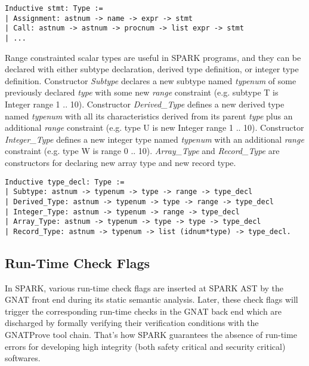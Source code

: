 \begin{lstlisting}[escapechar=\#, language=coq, basicstyle=\small]
Inductive stmt: Type := 
| Assignment: astnum -> name -> expr -> stmt 
| Call: astnum -> astnum -> procnum -> list expr -> stmt 
| ...
\end{lstlisting}

Range constrainted scalar types are useful in SPARK programs, and they can be
declared with either subtype declaration, derived type definition, or integer
type definition. 
Constructor \textit{Subtype} declares a new subtype named \textit{typenum}
of some previously declared \textit{type} with some new \textit{range}
constraint (e.g. subtype T is Integer range 1 .. 10).
Constructor \textit{Derived\_Type} defines a new derived type named
\textit{typenum} with all its characteristics derived from its parent
\textit{type} plus an additional \textit{range} constraint (e.g. type U is new
Integer range 1 .. 10).
Constructor \textit{Integer\_Type} defines a new integer type named
\textit{typenum} with an additional \textit{range} constraint (e.g. type W is
range 0 .. 10).
\textit{Array\_Type} and \textit{Record\_Type} are constructors for declaring
new array type and new record type.

\begin{lstlisting}[escapechar=\#, language=coq, basicstyle=\small]
Inductive type_decl: Type := 
| Subtype: astnum -> typenum -> type -> range -> type_decl 
| Derived_Type: astnum -> typenum -> type -> range -> type_decl 
| Integer_Type: astnum -> typenum -> range -> type_decl 
| Array_Type: astnum -> typenum -> type -> type -> type_decl 
| Record_Type: astnum -> typenum -> list (idnum*type) -> type_decl.
\end{lstlisting}


\subsection{Run-Time Check Flags}
In SPARK, various run-time check flags are inserted at SPARK AST by the GNAT
front end during its static semantic analysis. Later, these check flags will
trigger the corresponding run-time checks in the GNAT back end which are
discharged by formally verifying their verification conditions with the GNATProve
tool chain. That's how SPARK guarantees the absence of run-time errors for
developing high integrity (both safety critical and security critical)
softwares.

